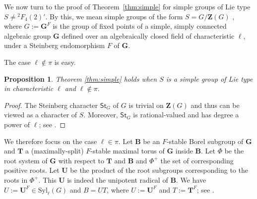 \documentclass[12pt]{amsart}
\newtheorem{proposition}[theorem]{Proposition}
\theoremstyle{definition}
\numberwithin{equation}{section}
\newcommand{\Syl}{{\mathrm {Syl}}}
\newcommand{\St}{{\mathsf {St}}}
\newcommand{\bG}{{\mathbf{G}}}
\newcommand{\bT}{{\mathbf{T}}}
\newcommand{\bB}{{\mathbf{B}}}
\newcommand{\bU}{{\mathbf{U}}}
\newcommand{\bZ}{{\mathbf{Z}}}
\begin{document}
\smallskip

We now %
turn to the proof of Theorem~\ref{thm:simple} for simple
groups of Lie type $S \neq {}^2F_4(2)'$. By this, we mean simple
groups of the form $S = G/\bZ(G)$%
, where $G := \bG^F$ is the group %
of fixed points of a simple, simply connected algebraic group $\bG$
defined over an %
algebraically closed field of characteristic $\ell$,
under a Steinberg %
endomorphism $F$ of %
$\bG$.

The %
case $\ell\notin\pi$ is %
easy.

\begin{proposition}\label{prop:ell-notin-pi}
Theorem \ref{thm:simple} holds when $S$ is a simple group of Lie
type in characteristic $\ell$ and $\ell\notin\pi$.
\end{proposition}

\begin{proof}
The Steinberg character $\St_G$ of $G$ is trivial on $\bZ(G)$ and
thus can be viewed as a character of $S$. Moreover, $\St_G$ is
rational-valued and has degree a power of $\ell$; see
\cite[Proposition~3.4.10]{GeckMalle}.
\end{proof}

We therefore focus on the case $\ell\in\pi$. Let $\bB$ be an
$F$-stable Borel subgroup of $\bG$ and $\bT$ a (maximally-split)
$F$-stable maximal torus of $\bG$ inside $\bB$. Let $\Phi$ be the
root system of $\bG$ with respect to $\bT$ and $\bB$ and $\Phi^+$
the set of corresponding positive roots. Let $\bU$ be the product of
the root subgroups corresponding to the roots in $\Phi^+$. This
$\bU$ is indeed the unipotent radical of $\bB$. We have
$U:=\bU^F\in\Syl_\ell(G)$ and $B=UT$, %
where $U:=\bU^F$ and
$T:=\bT^F$; see %
\cite[\S1.9 and \S2.9]{Carter85}.
\end{document}
